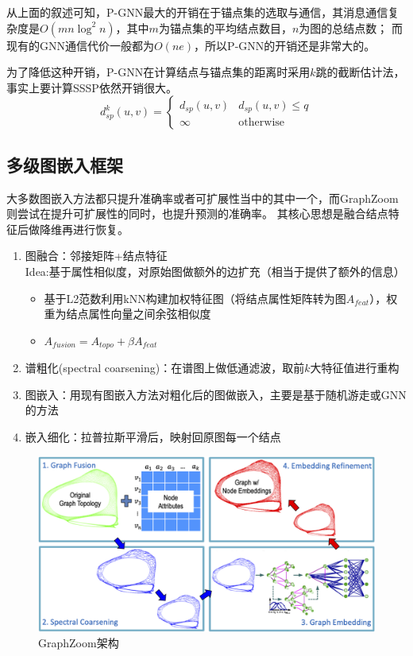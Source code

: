 \documentclass[reportComp]{thesis}
\begin{document}

从上面的叙述可知，P-GNN最大的开销在于锚点集的选取与通信，其消息通信复杂度是$O(mn\log^2 n)$，其中$m$为锚点集的平均结点数目，$n$为图的总结点数；
而现有的GNN通信代价一般都为$O(ne)$，所以P-GNN的开销还是非常大的。

为了降低这种开销，P-GNN在计算结点与锚点集的距离时采用$k$跳的截断估计法，事实上要计算SSSP依然开销很大。
\[d_{sp}^k(u,v)=\begin{cases}
d_{sp}(u,v) & d_{sp}(u,v)\leq q\\
\infty & \text{otherwise}
\end{cases}\]

\subsection{多级图嵌入框架}
大多数图嵌入方法都只提升准确率或者可扩展性当中的其中一个，而GraphZoom则尝试在提升可扩展性的同时，也提升预测的准确率。
其核心思想是融合结点特征后做降维再进行恢复。
\begin{enumerate}
	\item 图融合：邻接矩阵+结点特征\\
	Idea:基于属性相似度，对原始图做额外的边扩充（相当于提供了额外的信息）
	\begin{itemize}
		\item 基于L2范数利用kNN构建加权特征图（将结点属性矩阵转为图$A_{feat}$），权重为结点属性向量之间余弦相似度
		\item $A_{fusion}=A_{topo}+\beta A_{feat}$
	\end{itemize}
	\item 谱粗化(spectral coarsening)：在谱图上做低通滤波，取前$k$大特征值进行重构
	\item 图嵌入：用现有图嵌入方法对粗化后的图做嵌入，主要是基于随机游走或GNN的方法
	\item 嵌入细化：拉普拉斯平滑后，映射回原图每一个结点
\end{enumerate}
\begin{figure}[H]
\centering
\includegraphics[width=0.8\linewidth]{fig/GraphZoom.png}
\caption{GraphZoom架构}
\end{figure}
\end{document}

